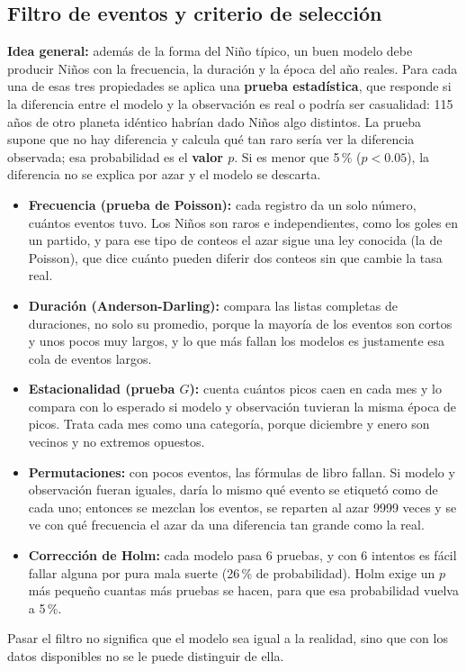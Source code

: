 \documentclass[11pt,a4paper]{article}
\begin{document}
\subsection{Filtro de eventos y criterio de selección}
\label{sec:filtro}

\begin{basico}
\textbf{Idea general:} además de la forma del Niño típico, un buen modelo debe producir Niños con la frecuencia, la duración y la época del año reales. Para cada una de esas tres propiedades se aplica una \textbf{prueba estadística}, que responde si la diferencia entre el modelo y la observación es real o podría ser casualidad: 115 años de otro planeta idéntico habrían dado Niños algo distintos. La prueba supone que no hay diferencia y calcula qué tan raro sería ver la diferencia observada; esa probabilidad es el \textbf{valor $p$}. Si es menor que 5\,\% ($p < 0.05$), la diferencia no se explica por azar y el modelo se descarta.

\begin{itemize}[nosep,leftmargin=*]
\item \textbf{Frecuencia (prueba de Poisson):} cada registro da un solo número, cuántos eventos tuvo. Los Niños son raros e independientes, como los goles en un partido, y para ese tipo de conteos el azar sigue una ley conocida (la de Poisson), que dice cuánto pueden diferir dos conteos sin que cambie la tasa real.
\item \textbf{Duración (Anderson-Darling):} compara las listas completas de duraciones, no solo su promedio, porque la mayoría de los eventos son cortos y unos pocos muy largos, y lo que más fallan los modelos es justamente esa cola de eventos largos.
\item \textbf{Estacionalidad (prueba $G$):} cuenta cuántos picos caen en cada mes y lo compara con lo esperado si modelo y observación tuvieran la misma época de picos. Trata cada mes como una categoría, porque diciembre y enero son vecinos y no extremos opuestos.
\item \textbf{Permutaciones:} con pocos eventos, las fórmulas de libro fallan. Si modelo y observación fueran iguales, daría lo mismo qué evento se etiquetó como de cada uno; entonces se mezclan los eventos, se reparten al azar 9999 veces y se ve con qué frecuencia el azar da una diferencia tan grande como la real.
\item \textbf{Corrección de Holm:} cada modelo pasa 6 pruebas, y con 6 intentos es fácil fallar alguna por pura mala suerte (26\,\% de probabilidad). Holm exige un $p$ más pequeño cuantas más pruebas se hacen, para que esa probabilidad vuelva a 5\,\%.
\end{itemize}
Pasar el filtro no significa que el modelo sea igual a la realidad, sino que con los datos disponibles no se le puede distinguir de ella.
\end{basico}
\end{document}
